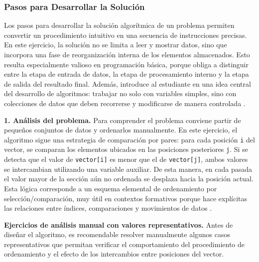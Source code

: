 \documentclass[12pt,twoside]{book}
\begin{document}
					\subsubsection{Pasos para Desarrollar la Solución}
						Los pasos para desarrollar la solución algorítmica de un problema permiten convertir un procedimiento intuitivo en una secuencia de instrucciones precisas. En este ejercicio, la solución no se limita a leer y mostrar datos, sino que incorpora una fase de reorganización interna de los elementos almacenados. Esto resulta especialmente valioso en programación básica, porque obliga a distinguir entre la etapa de entrada de datos, la etapa de procesamiento interno y la etapa de salida del resultado final. Además, introduce al estudiante en una idea central del desarrollo de algoritmos: trabajar no solo con variables simples, sino con colecciones de datos que deben recorrerse y modificarse de manera controlada \cite{Futschek2006Algorithmic,Qian2018Students,Robins2003Learning,Lister2004Learning}.
						
						\noindent
						\textbf{1. Análisis del problema.}  
						Para comprender el problema conviene partir de pequeños conjuntos de datos y ordenarlos manualmente. En este ejercicio, el algoritmo sigue una estrategia de comparación por pares: para cada posición \texttt{i} del vector, se comparan los elementos ubicados en las posiciones posteriores \texttt{j}. Si se detecta que el valor de \texttt{vector[i]} es menor que el de \texttt{vector[j]}, ambos valores se intercambian utilizando una variable auxiliar. De esta manera, en cada pasada el valor mayor de la sección aún no ordenada se desplaza hacia la posición actual. Esta lógica corresponde a un esquema elemental de ordenamiento por selección/comparación, muy útil en contextos formativos porque hace explícitas las relaciones entre índices, comparaciones y movimientos de datos \cite{Cormen2022Introduction,Sebesta2018Concepts}.
						
						\noindent
						\textbf{Ejercicios de análisis manual con valores representativos.}
						Antes de diseñar el algoritmo, es recomendable resolver manualmente algunos casos representativos que permitan verificar el comportamiento del procedimiento de ordenamiento y el efecto de los intercambios entre posiciones del vector.
						
\end{document}
